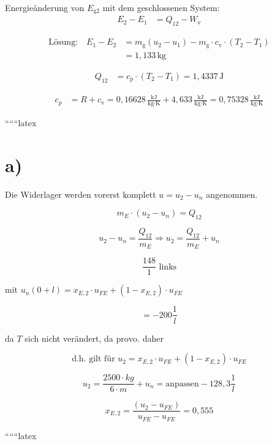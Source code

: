 Energieänderung von $E_{\text{g2}}$ mit dem geschlossenen System:
\begin{align*}
E_2 - E_1 &= Q_{12} - W_{\text{v}}
\end{align*}

\begin{align*}
\text{Lösung:} \quad E_1 - E_2 &= m_{\text{g}} (u_2 - u_1) - m_{\text{g}} \cdot c_{\text{v}} \cdot (T_2 - T_1) \\
&= 1,133 \, \text{kg}
\end{align*}

\begin{align*}
Q_{12} &= c_p \cdot (T_2 - T_1) = 1,4337 \, \text{J}
\end{align*}

\begin{align*}
c_p &= R + c_{\text{v}} = 0,16628 \, \frac{\text{kJ}}{\text{kg} \cdot \text{K}} + 4,633 \, \frac{\text{kJ}}{\text{kg} \cdot \text{K}} = 0,75328 \, \frac{\text{kJ}}{\text{kg} \cdot \text{K}}
\end{align*}

``````latex


\section*{a)}

Die Widerlager werden vorerst komplett \( u = u_{2} - u_{n} \) angenommen.

\[
m_E \cdot (u_2 - u_n) = Q_{12}
\]

\[
u_2 - u_n = \frac{Q_{12}}{m_E} \Rightarrow u_2 = \frac{Q_{12}}{m_E} + u_n
\]

\[
\frac{148}{1} \text{ links}
\]

mit \( u_n \left(0 + l\right) = x_{E,2} \cdot u_{FE} + (1 - x_{E,2}) \cdot u_{FE} \)

\[
= -200 \frac{1}{l}
\]

da \( T \) sich nicht verändert, da \( \text{provo.} \) daher

\[
\text{d.h.} \text{ gilt für } u_2 = x_{E,2} \cdot u_{FE} + (1 - x_{E,2}) \cdot u_{FE}
\]

\[
u_2 = \frac{2500 \cdot kg}{6 \cdot m} + u_n = \text{anpassen} - 128,3 \frac{1}{l}
\]

\[
x_{E,2} = \frac{(u_2 - u_{FE})}{u_{FE} - u_{FE}} = 0,555
\]

``````latex


